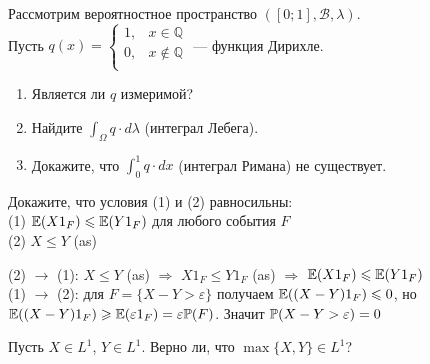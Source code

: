 \begin{problem}
Рассмотрим вероятностное пространство
$([0;1],\mathcal{B},\lambda)$. \\
Пусть $q(x)=
\begin{cases}
  1, & x\in \mathbb{Q} \\
  0, & x\notin \mathbb{Q} \\
\end{cases}$ — функция Дирихле.
\begin{enumerate}
\item Является ли $q$ измеримой?
\item Найдите $\int_{\Omega}q \cdot d\lambda$ (интеграл Лебега).
\item Докажите, что $\int_{0}^{1} q \cdot dx$ (интеграл Римана) не
существует.
\end{enumerate}

\begin{sol}

\end{sol}
\end{problem}

\begin{problem}
Докажите, что условия (1) и (2) равносильны: \\
(1) $\E(X 1_{F})\le \E(Y 1_{F})$ для любого события $F$ \\
(2) $X\le Y$ (as)

\begin{sol}


(2) $\rightarrow$ (1): $X\le Y$ (as) $\Rightarrow$ $X 1_{F}\le Y
1_{F}$ (as) $\Rightarrow$ $\E(X 1_{F})\le \E(Y 1_{F})$ \\
(1) $\rightarrow$ (2): для $F=\{X-Y>\varepsilon\}$ получаем
$\E((X-Y) 1_{F})\le
 0$, но $\E((X-Y) 1_{F})\ge \E(\varepsilon 1_{F})=\varepsilon \P(F)$.
Значит $\P(X-Y>\varepsilon)=0$
\end{sol}
\end{problem}

\begin{problem}
Пусть $X\in L^{1}$, $Y\in L^{1}$. Верно ли, что $\max\{X,Y\}\in
L^{1}$?

\begin{sol}

\end{sol}
\end{problem}

